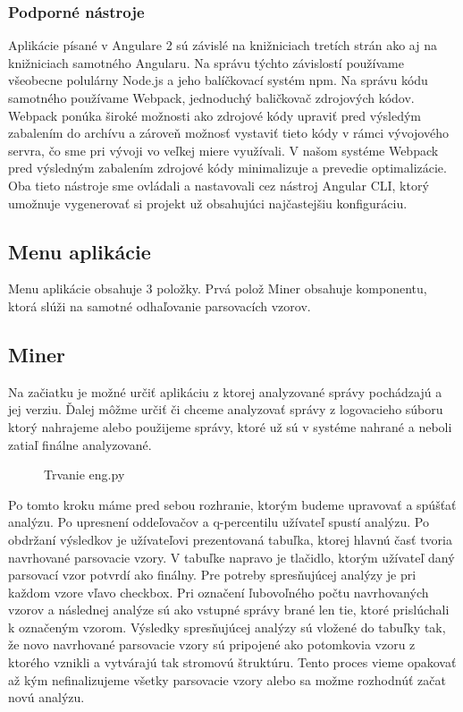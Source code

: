 \subsubsection*{Podporné nástroje}
Aplikácie písané v Angulare 2 sú závislé na knižniciach tretích strán ako aj na knižniciach samotného Angularu. Na správu týchto závislostí používame všeobecne polulárny Node.js a jeho balíčkovací systém npm. Na správu kódu samotného používame Webpack, jednoduchý baličkovač zdrojových kódov. Webpack ponúka široké možnosti ako zdrojové kódy upraviť pred výsledým zabalením do archívu a zároveň možnosť vystaviť tieto kódy v rámci vývojového servra, čo sme pri vývoji vo veľkej miere využívali. V našom systéme Webpack pred výsledným zabalením zdrojové kódy minimalizuje a prevedie optimalizácie. Oba tieto nástroje sme ovládali a nastavovali cez nástroj Angular CLI, ktorý umožnuje vygenerovať si projekt už obsahujúci najčastejšiu konfiguráciu. 

\subsection{Menu aplikácie}
Menu aplikácie obsahuje 3 položky. Prvá polož Miner obsahuje komponentu, ktorá slúži na samotné odhaľovanie parsovacích vzorov.


\subsection{Miner}
Na začiatku je možné určiť aplikáciu z ktorej analyzované správy pochádzajú a jej verziu. Ďalej môžme určiť či chceme analyzovať správy z  logovacieho súboru ktorý nahrajeme alebo použijeme správy, ktoré už sú v systéme nahrané a neboli zatiaľ finálne analyzované.

\begin{figure}[htbp]
 \centering 
 \begin{minipage}{0.95\linewidth}
 	\centering
 \end{minipage}
  \caption{Trvanie eng.py }
  \label{fig:eng-duration}
\end{figure}

Po tomto kroku máme pred sebou rozhranie, ktorým budeme upravovať a spúšťať analýzu. Po upresnení oddeľovačov a q-percentilu užívateľ spustí analýzu. Po obdržaní výsledkov je užívateľovi prezentovaná tabuľka, ktorej hlavnú časť tvoria navrhované parsovacie vzory. V tabuľke napravo je tlačidlo, ktorým užívateľ daný parsovací vzor potvrdí ako finálny. Pre potreby spresňujúcej analýzy je pri každom vzore vľavo checkbox. Pri označení ľubovoľného počtu navrhovaných vzorov a následnej analýze sú ako vstupné správy brané len tie, ktoré prislúchali k označeným vzorom. Výsledky spresňujúcej analýzy sú vložené do tabuľky tak, že novo navrhované parsovacie vzory sú pripojené ako potomkovia vzoru z ktorého vznikli a vytvárajú tak stromovú štruktúru. Tento proces vieme opakovať až kým nefinalizujeme všetky parsovacie vzory alebo sa možme rozhodnúť začat novú analýzu.

